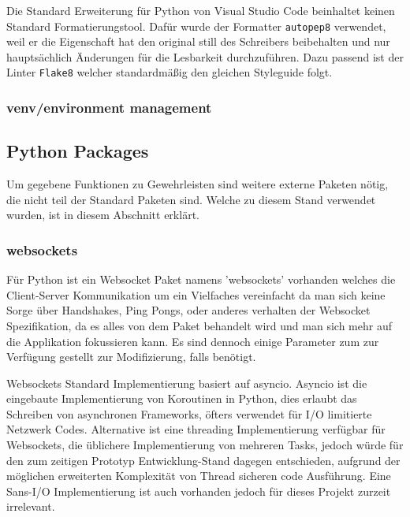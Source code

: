 Die Standard Erweiterung für Python von Visual Studio Code 
beinhaltet keinen Standard Formatierungstool.
Dafür wurde der Formatter \texttt{autopep8} verwendet, 
weil er die Eigenschaft hat den original still des Schreibers beibehalten
und nur hauptsächlich Änderungen für die Lesbarkeit durchzuführen. 
Dazu passend ist der Linter \texttt{Flake8} welcher standardmäßig 
den gleichen Styleguide  folgt.
\subsubsection{venv/environment management}


\subsection{Python Packages}
Um gegebene Funktionen zu Gewehrleisten sind weitere externe Paketen nötig, 
die nicht teil der Standard Paketen sind.
Welche zu diesem Stand verwendet wurden, ist in diesem Abschnitt erklärt.

\subsubsection{websockets}
Für Python ist ein Websocket Paket namens 'websockets' vorhanden 
welches die Client-Server Kommunikation um ein Vielfaches vereinfacht 
da man sich keine Sorge über Handshakes, Ping Pongs, 
oder anderes verhalten der Websocket Spezifikation, 
da es alles von dem Paket behandelt wird 
und man sich mehr auf die Applikation fokussieren kann. 
Es sind dennoch einige Parameter zum zur Verfügung gestellt zur Modifizierung, 
falls benötigt.

Websockets Standard Implementierung basiert auf asyncio.
%  
Asyncio ist die eingebaute Implementierung von Koroutinen in Python,
dies erlaubt das Schreiben von asynchronen Frameworks, 
öfters verwendet für I/O limitierte Netzwerk Codes.
Alternative ist eine threading Implementierung verfügbar für Websockets, 
die üblichere Implementierung von mehreren Tasks, 
jedoch würde für den zum zeitigen Prototyp Entwicklung-Stand dagegen entschieden,
aufgrund der möglichen erweiterten Komplexität von Thread sicheren code Ausführung.
Eine Sans-I/O Implementierung ist auch vorhanden 
jedoch für dieses Projekt zurzeit irrelevant.

